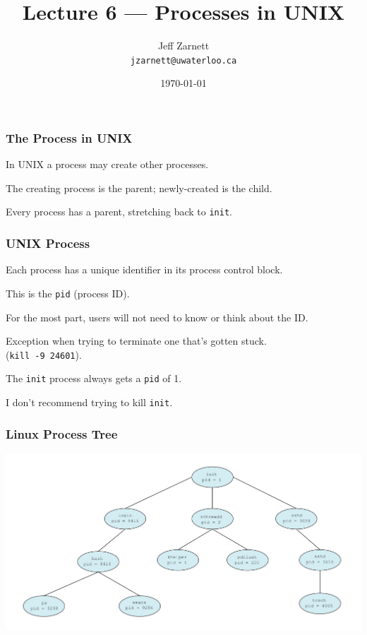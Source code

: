 

\title{Lecture 6 --- Processes in UNIX}

\author{Jeff Zarnett \\ \small \texttt{jzarnett@uwaterloo.ca}}
\date{\today}




\begin{frame}
  \titlepage

 \end{frame}

\begin{frame}
\frametitle{The Process in UNIX}

In UNIX a process may create other processes.

The creating process is the parent; newly-created is the child.

Every process has a parent, stretching back to \texttt{init}.

\end{frame}


\begin{frame}
\frametitle{UNIX Process}
Each process has a unique identifier in its process control block.

This is the \texttt{pid} (process ID). 

For the most part, users will not need to know or think about the ID.

Exception when trying to terminate one that's gotten stuck.\\
\quad (\texttt{kill -9 24601}). 

The \texttt{init} process always gets a \texttt{pid} of 1. 

I don't recommend trying to kill \texttt{init}.

\end{frame}

\begin{frame}
\frametitle{Linux Process Tree}

\begin{center}
\includegraphics[width=\textwidth]{images/linux-process-tree.png}
\end{center}

\end{frame}

